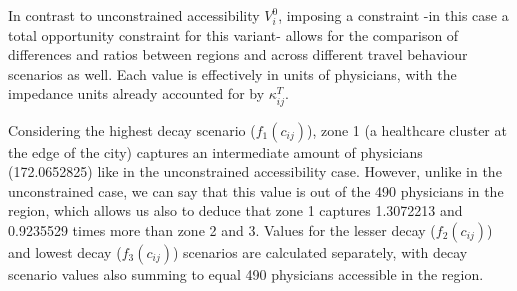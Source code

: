 \documentclass[
  10pt,
  letterpaper,
]{article}
\begin{document}
\begin{table}

\caption{\label{tbl-simple-example-total-opportunity-accessibility}Simple
system: total constrained accessible opportunities.}


\end{table}%

In contrast to unconstrained accessibility \(V^0_i\), imposing a
constraint -in this case a total opportunity constraint for this
variant- allows for the comparison of differences and ratios between
regions and across different travel behaviour scenarios as well. Each
value is effectively in units of physicians, with the impedance units
already accounted for by \(\kappa_{ij}^T\).

Considering the highest decay scenario (\(f_1(c_{ij})\)), zone 1 (a
healthcare cluster at the edge of the city) captures an intermediate
amount of physicians (172.0652825) like in the unconstrained
accessibility case. However, unlike in the unconstrained case, we can
say that this value is out of the 490 physicians in the region, which
allows us also to deduce that zone 1 captures 1.3072213 and 0.9235529
times more than zone 2 and 3. Values for the lesser decay
(\(f_2(c_{ij})\)) and lowest decay (\(f_3(c_{ij})\)) scenarios are
calculated separately, with decay scenario values also summing to equal
490 physicians accessible in the region.
\end{document}
